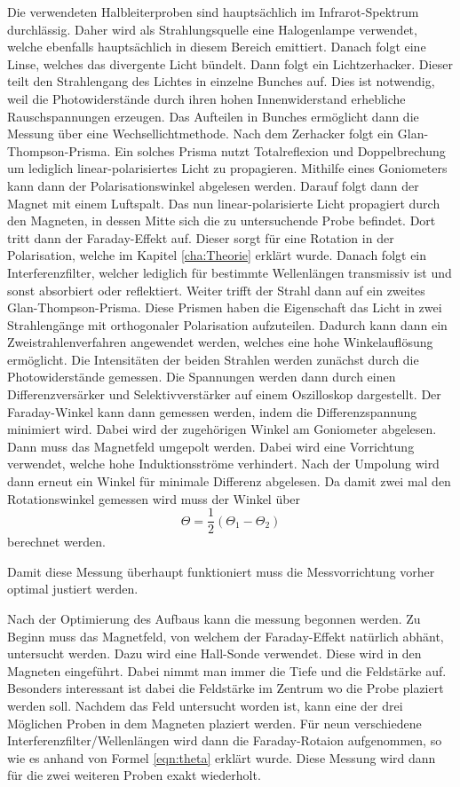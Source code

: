 Die verwendeten Halbleiterproben  sind hauptsächlich im Infrarot-Spektrum durchlässig. Daher wird als Strahlungsquelle eine Halogenlampe verwendet, welche ebenfalls 
hauptsächlich in diesem Bereich emittiert. Danach folgt eine Linse, welches das divergente Licht bündelt.
Dann folgt ein Lichtzerhacker. Dieser teilt den Strahlengang des Lichtes in einzelne Bunches auf. Dies ist notwendig,
weil die Photowiderstände durch ihren hohen Innenwiderstand erhebliche Rauschspannungen erzeugen. Das Aufteilen in Bunches ermöglicht dann die Messung über eine Wechsellichtmethode.
Nach dem Zerhacker folgt ein Glan-Thompson-Prisma. Ein solches Prisma nutzt Totalreflexion und Doppelbrechung um lediglich linear-polarisiertes Licht zu propagieren. 
Mithilfe eines Goniometers kann dann der Polarisationswinkel abgelesen 
werden. Darauf folgt dann der Magnet mit einem Luftspalt. Das nun linear-polarisierte Licht propagiert durch den Magneten, in dessen Mitte sich die zu untersuchende Probe befindet. Dort 
tritt dann der Faraday-Effekt auf. Dieser sorgt für eine Rotation in der Polarisation, welche im Kapitel \ref{cha:Theorie} erklärt wurde. Danach folgt ein Interferenzfilter, welcher 
lediglich für bestimmte Wellenlängen transmissiv ist und sonst absorbiert oder reflektiert. Weiter trifft der Strahl dann auf ein zweites Glan-Thompson-Prisma. Diese Prismen haben 
die Eigenschaft das Licht in zwei Strahlengänge mit orthogonaler Polarisation aufzuteilen. Dadurch kann dann ein Zweistrahlenverfahren angewendet werden, welches eine hohe Winkelauflösung 
ermöglicht. Die Intensitäten der beiden Strahlen werden zunächst durch die Photowiderstände gemessen. Die Spannungen werden dann durch einen Differenzversärker und Selektivverstärker 
auf einem Oszilloskop dargestellt. Der Faraday-Winkel kann dann gemessen werden, indem die Differenzspannung minimiert wird. Dabei wird der zugehörigen Winkel am Goniometer abgelesen. 
Dann muss das Magnetfeld umgepolt werden. Dabei wird eine Vorrichtung verwendet, welche hohe Induktionsströme verhindert. Nach der Umpolung wird dann erneut ein Winkel für minimale 
Differenz abgelesen. Da damit zwei mal den Rotationswinkel gemessen wird muss der Winkel über 
\begin{equation}
              \label{eqn:theta}
              \Theta = \frac{1}{2}\left(\Theta_1 - \Theta_2\right)
\end{equation}
berechnet werden.

Damit diese Messung überhaupt funktioniert muss die Messvorrichtung vorher optimal justiert werden. 

Nach der Optimierung des Aufbaus kann die messung begonnen werden. Zu Beginn muss das Magnetfeld, von welchem der Faraday-Effekt natürlich abhänt, untersucht werden. Dazu wird eine 
Hall-Sonde verwendet. Diese wird in den Magneten eingeführt. Dabei nimmt man immer die Tiefe und die Feldstärke auf. Besonders interessant ist dabei die Feldstärke im Zentrum
wo die Probe plaziert werden soll. Nachdem das Feld untersucht worden ist, kann eine der drei Möglichen  Proben in dem Magneten plaziert werden. Für neun verschiedene 
Interferenzfilter/Wellenlängen wird dann die Faraday-Rotaion aufgenommen, so wie es anhand von Formel \eqref{eqn:theta} erklärt wurde. Diese Messung wird dann für die zwei weiteren 
Proben exakt wiederholt.   